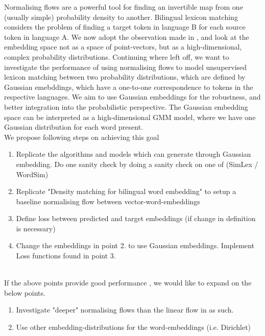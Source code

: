 \documentclass{NSF}
\begin{document}
Normalising flows are a powerful tool for finding an invertible map from one (usually simple) probability density to another.
Bilingual lexicon matching considers the problem of finding a target token in language B for each source token in language A.
We now adopt the observation made in \cite{density_matching}, and look at the embedding space not as a space of point-vectors, but as a high-dimensional, complex probability distributions.
Continuing where \cite{density_matching} left off, we want to investigate the performance of using normalising flows to model unsupervised lexicon matching between two probability distributions, which are defined by Gaussian emebddings, which have a one-to-one correspondence to tokens in the respective languages.
We aim to use Gaussian embeddings for the robustness, and better integration into the probabilistic perspective.
The Gaussian embedding space can be interpreted as a high-dimensional GMM model, where we have one Gaussian distribution for each word present. \\

We propose following steps on achieving this goal

\begin{enumerate}[topsep=2pt, partopsep=2pt]
    \item Replicate the algorithms and models which can generate through Gaussian embedding. Do one sanity check by doing a sanity check on one of (SimLex / WordSim)
    \item Replicate "Density matching for bilingual word embedding" to setup a baseline normalising flow between vector-word-embeddings \cite{density_matching}
    \item Define loss between predicted and target embeddings (if change in definition is necessary)
    \item Change the embeddings in point 2. to use Gaussian embeddings. Implement Loss functions found in point 3.
\end{enumerate} \\

If the above points provide good performance , we would like to expand on the below points.

\begin{enumerate}
    \item Investigate "deeper" normalising flows than the linear flow in \cite{density_matching} as such.
    \item Use other embedding-distributions for the word-embeddings (i.e. Dirichlet)
\end{enumerate}\\
\end{document}
